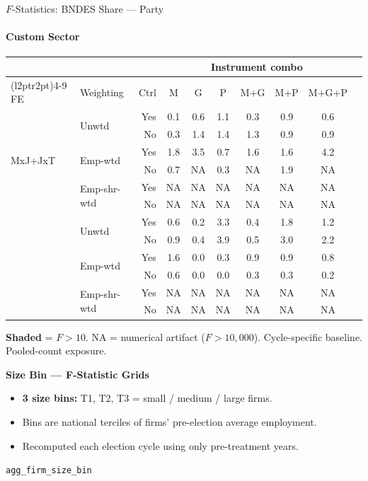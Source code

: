 \documentclass[aspectratio=169,10pt]{beamer}
\begin{document}
\begin{frame}[t]{$F$-Statistics: BNDES Share --- Party}
\framesubtitle{Custom Sector}
\begin{center}
\footnotesize
\setlength{\tabcolsep}{3.5pt}
\renewcommand{\arraystretch}{1.05}
\begin{tabular}{@{}llrccccccc@{}}
\toprule
 & & & \multicolumn{6}{c}{Instrument combo} \\
\cmidrule(l{2pt}r{2pt}){4-9}
FE & Weighting & Ctrl & M & G & P & M+G & M+P & M+G+P \\
\midrule
  \multirow{6}{*}{MxJ+JxT} & \multirow{2}{*}{Unwtd} & Yes & 0.1 & 0.6 & 1.1 & 0.3 & 0.9 & 0.6 \\
   &  & No & 0.3 & 1.4 & 1.4 & 1.3 & 0.9 & 0.9 \\
   & \multirow{2}{*}{Emp-wtd} & Yes & 1.8 & 3.5 & 0.7 & 1.6 & 1.6 & 4.2 \\
   &  & No & 0.7 & NA & 0.3 & NA & 1.9 & NA \\
   & \multirow{2}{*}{Emp-shr-wtd} & Yes & NA & NA & NA & NA & NA & NA \\
   &  & No & NA & NA & NA & NA & NA & NA \\
\addlinespace[5pt]
  \multirow{6}{*}{MxJ+MxT} & \multirow{2}{*}{Unwtd} & Yes & 0.6 & 0.2 & 3.3 & 0.4 & 1.8 & 1.2 \\
   &  & No & 0.9 & 0.4 & 3.9 & 0.5 & 3.0 & 2.2 \\
   & \multirow{2}{*}{Emp-wtd} & Yes & 1.6 & 0.0 & 0.3 & 0.9 & 0.9 & 0.8 \\
   &  & No & 0.6 & 0.0 & 0.0 & 0.3 & 0.3 & 0.2 \\
   & \multirow{2}{*}{Emp-shr-wtd} & Yes & NA & NA & NA & NA & NA & NA \\
   &  & No & NA & NA & NA & NA & NA & NA \\
\bottomrule
\end{tabular}
\end{center}
{\scriptsize \colorbox{pass}{\textbf{Shaded}} = $F>10$. NA = numerical artifact ($F>10{,}000$). Cycle-specific baseline. Pooled-count exposure.}
\end{frame}


\begin{frame}[plain]
\begin{center}
{\Large\textbf{Size Bin --- F-Statistic Grids}}\\[0.5em]
\end{center}
\small
\begin{itemize}
\item \textbf{3 size bins:} T1, T2, T3 = small / medium / large firms.
\item Bins are national terciles of firms' pre-election average employment.
\item Recomputed each election cycle using only pre-treatment years.
\end{itemize}
\vfill
\begin{center}
{\scriptsize \texttt{agg\_firm\_size\_bin}}
\end{center}
\end{frame}
\end{document}
